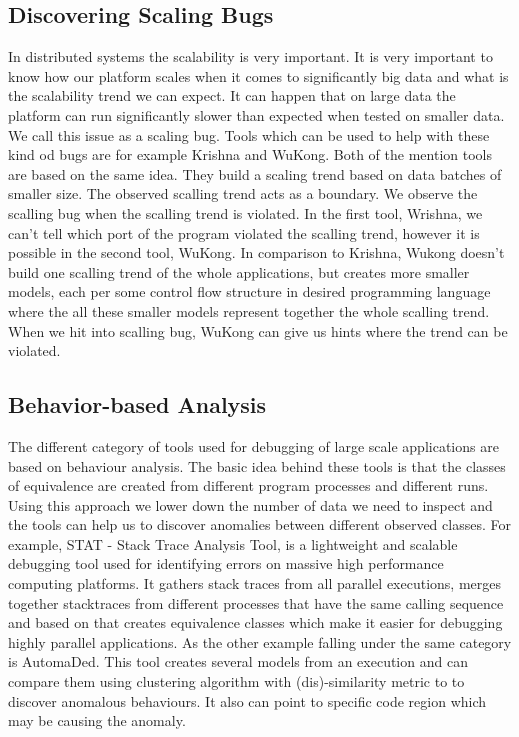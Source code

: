 \subsection{Discovering Scaling Bugs}
In distributed systems the scalability is very important. It is very important to know how our platform scales when it comes to significantly big data and what is the scalability trend we can expect. It can happen that on large data the platform can run significantly slower than expected when tested on smaller data. We call this issue as a scaling bug. Tools which can be used to help with these kind od bugs are for example Krishna and WuKong. Both of the mention tools are based on the same idea. They build a scaling trend based on data batches of smaller size. The observed scalling trend acts as a boundary. We observe the scalling bug when the scalling trend is violated. In the first tool, Wrishna, we can't tell which port of the program violated the scalling trend, however it is possible in the second tool, WuKong. In comparison to Krishna, Wukong doesn't build one scalling trend of the whole applications, but creates more smaller models, each per some control flow structure in desired programming language where the all these smaller models represent together the whole scalling trend. When we hit into scalling bug, WuKong can give us hints where the trend can be violated.

\subsection{Behavior-based Analysis}
The different category of tools used for debugging of large scale applications are based on behaviour analysis. The basic idea behind these tools is that the classes of equivalence are created from different program processes and different runs. Using this approach we lower down the number of data we need to inspect and the tools can help us to discover anomalies between different observed classes. For example, STAT - Stack Trace Analysis Tool, is a lightweight and scalable debugging tool used for identifying errors on massive high performance computing platforms. It gathers stack traces from all parallel executions, merges together stacktraces from different processes that have the same calling sequence and based on that creates equivalence classes which make it easier for debugging highly parallel applications. As the other example falling under the same category is AutomaDed. This tool creates several models from an execution and can compare them using clustering algorithm with (dis)-similarity metric to to discover anomalous behaviours. It also can point to specific code region which may be causing the anomaly.

